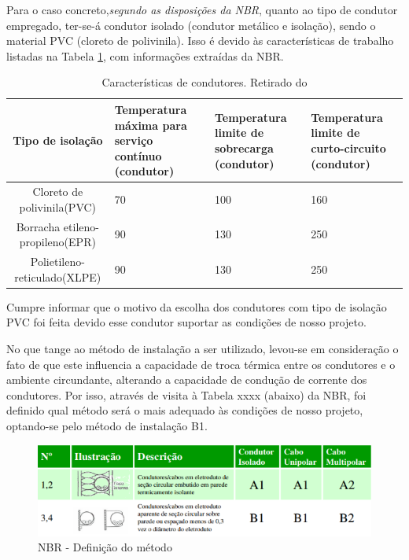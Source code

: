 Para o caso concreto,\textit{segundo as disposições da NBR}, quanto ao tipo de condutor empregado, ter-se-á condutor isolado (condutor metálico e isolação), sendo o material PVC (cloreto de polivinila). Isso é devido às características de trabalho listadas na Tabela \ref{nbr}, com informações extraídas da NBR.

\begin{table}[h]
\begin{tabular}{| c | p{3cm} | p{3cm} | p{3cm} |}
\hline
Tipo de isolação                & Temperatura máxima para serviço contínuo (condutor) & Temperatura limite de sobrecarga (condutor) & Temperatura limite de curto-circuito (condutor) \\ \hline
Cloreto de polivinila(PVC)      & 70                                                 & 100                                        & 160                                            \\ \hline
Borracha etileno-propileno(EPR) & 90                                                 & 130                                        & 250                                            \\ \hline
Polietileno-reticulado(XLPE)    & 90                                                 & 130                                        & 250                                           
\\ \hline
\end{tabular}
\caption{Características de condutores. Retirado do}
\label{nbr}
\end{table}

Cumpre informar que o motivo da escolha dos condutores com tipo de isolação PVC foi feita devido esse condutor suportar as condições de nosso projeto.

No que tange ao método de instalação a ser utilizado, levou-se em consideração o fato de que este influencia a capacidade de troca térmica entre os condutores e o ambiente circundante, alterando a capacidade de condução de corrente dos condutores. Por isso, através de visita à Tabela xxxx (abaixo) da NBR, foi definido qual método será o mais adequado às condições de nosso projeto, optando-se pelo método de instalação B1.

\begin{figure}[h]
	\centering
	\includegraphics[scale=0.8]		{figuras/nbr.png}
	\caption{NBR - Definição do método}
	\label{alternador}
\end{figure}


